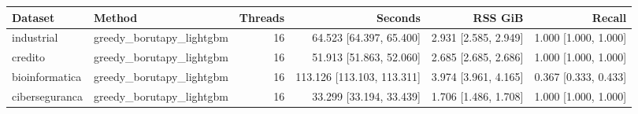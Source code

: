 \begin{tabular}{llrrrr}
Dataset & Method & Threads & Seconds & RSS GiB & Recall \\
\hline
industrial & greedy\_borutapy\_lightgbm & 16 & 64.523 [64.397, 65.400] & 2.931 [2.585, 2.949] & 1.000 [1.000, 1.000] \\
credito & greedy\_borutapy\_lightgbm & 16 & 51.913 [51.863, 52.060] & 2.685 [2.685, 2.686] & 1.000 [1.000, 1.000] \\
bioinformatica & greedy\_borutapy\_lightgbm & 16 & 113.126 [113.103, 113.311] & 3.974 [3.961, 4.165] & 0.367 [0.333, 0.433] \\
ciberseguranca & greedy\_borutapy\_lightgbm & 16 & 33.299 [33.194, 33.439] & 1.706 [1.486, 1.708] & 1.000 [1.000, 1.000] \\
\end{tabular}
